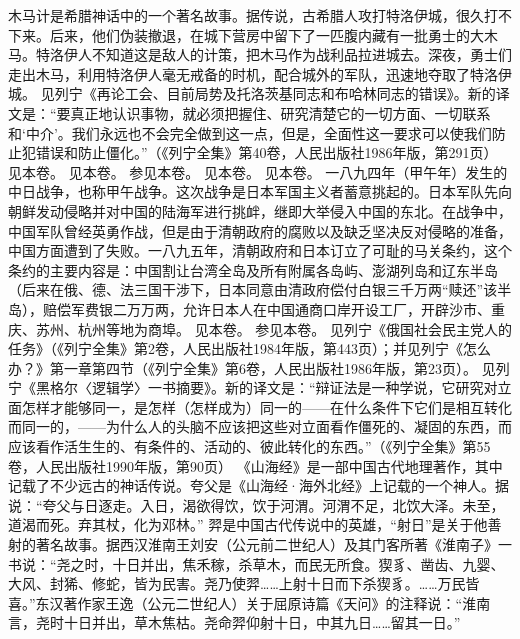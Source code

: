 \begin{maonote}
木马计是希腊神话中的一个著名故事。据传说，古希腊人攻打特洛伊城，很久打不下来。后来，他们伪装撤退，在城下营房中留下了一匹腹内藏有一批勇士的大木马。特洛伊人不知道这是敌人的计策，把木马作为战利品拉进城去。深夜，勇士们走出木马，利用特洛伊人毫无戒备的时机，配合城外的军队，迅速地夺取了特洛伊城。
见列宁《再论工会、目前局势及托洛茨基同志和布哈林同志的错误》。新的译文是：“要真正地认识事物，就必须把握住、研究清楚它的一切方面、一切联系和‘中介’。我们永远也不会完全做到这一点，但是，全面性这一要求可以使我们防止犯错误和防止僵化。”（《列宁全集》第40卷，人民出版社1986年版，第291页）
见本卷。
见本卷。
参见本卷。
见本卷。
见本卷。
一八九四年（甲午年）发生的中日战争，也称甲午战争。这次战争是日本军国主义者蓄意挑起的。日本军队先向朝鲜发动侵略并对中国的陆海军进行挑衅，继即大举侵入中国的东北。在战争中，中国军队曾经英勇作战，但是由于清朝政府的腐败以及缺乏坚决反对侵略的准备，中国方面遭到了失败。一八九五年，清朝政府和日本订立了可耻的马关条约，这个条约的主要内容是：中国割让台湾全岛及所有附属各岛屿、澎湖列岛和辽东半岛（后来在俄、德、法三国干涉下，日本同意由清政府偿付白银三千万两“赎还”该半岛），赔偿军费银二万万两，允许日本人在中国通商口岸开设工厂，开辟沙市、重庆、苏州、杭州等地为商埠。
见本卷。
参见本卷。
见列宁《俄国社会民主党人的任务》（《列宁全集》第2卷，人民出版社1984年版，第443页）；并见列宁《怎么办？》第一章第四节（《列宁全集》第6卷，人民出版社1986年版，第23页）。
见列宁《黑格尔〈逻辑学〉一书摘要》。新的译文是：“辩证法是一种学说，它研究对立面怎样才能够同一，是怎样（怎样成为）同一的——在什么条件下它们是相互转化而同一的，——为什么人的头脑不应该把这些对立面看作僵死的、凝固的东西，而应该看作活生生的、有条件的、活动的、彼此转化的东西。”（《列宁全集》第55卷，人民出版社1990年版，第90页）
《山海经》是一部中国古代地理著作，其中记载了不少远古的神话传说。夸父是《山海经·海外北经》上记载的一个神人。据说：“夸父与日逐走。入日，渴欲得饮，饮于河渭。河渭不足，北饮大泽。未至，道渴而死。弃其杖，化为邓林。”
羿是中国古代传说中的英雄，“射日”是关于他善射的著名故事。据西汉淮南王刘安（公元前二世纪人）及其门客所著《淮南子》一书说：“尧之时，十日并出，焦禾稼，杀草木，而民无所食。猰豸、凿齿、九婴、大风、封狶、修蛇，皆为民害。尧乃使羿……上射十日而下杀猰豸。……万民皆喜。”东汉著作家王逸（公元二世纪人）关于屈原诗篇《天问》的注释说：“淮南言，尧时十日并出，草木焦枯。尧命羿仰射十日，中其九日……留其一日。”

\end{maonote}
